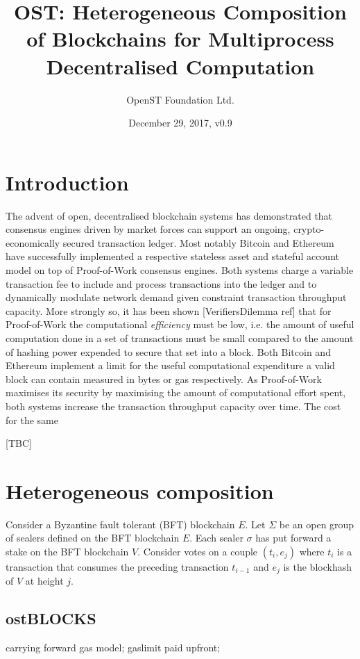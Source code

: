 \documentclass[12pt,a4paper, twocolumn]{article}
\title{{\sc OST: Heterogeneous Composition of Blockchains for Multiprocess Decentralised Computation}}
\author{OpenST Foundation Ltd.}
\date{December 29, 2017, v0.9}
\begin{document}
\maketitle

\section{Introduction}

The advent of open, decentralised blockchain systems has demonstrated that consensus engines driven by market forces can support an ongoing, crypto-economically secured transaction ledger.  Most notably Bitcoin and Ethereum have successfully implemented a respective stateless asset and stateful account model on top of Proof-of-Work consensus engines.  Both systems charge a variable transaction fee to include and process transactions into the ledger and to dynamically modulate network demand given  constraint transaction throughput capacity.  More strongly so, it has been shown [VerifiersDilemma ref] that for Proof-of-Work the computational \emph{efficiency} must be low, i.e. the amount of useful computation done in a set of transactions must be small compared to the amount of hashing power expended to secure that set into a block.
Both Bitcoin and Ethereum implement a limit for the useful computational expenditure a valid block can contain measured in bytes or gas respectively.  As Proof-of-Work maximises its security by maximising the amount of computational effort spent, both systems increase the transaction throughput capacity over time.  The cost for the same 

[TBC]

\section{Heterogeneous composition}

Consider a Byzantine fault tolerant (BFT) blockchain $E$. Let $\Sigma$ be an open group of sealers defined on the BFT blockchain $E$.  Each sealer $\sigma$ has put forward a stake on the BFT blockchain $V$. Consider votes on a couple $(t_i, e_j)$ where $t_i$ is a transaction that consumes the preceding transaction $t_{i-1}$ and $e_j$ is the blockhash of $V$ at height $j$.

\subsection{ostBLOCKS}

carrying forward gas model;
gaslimit paid upfront; 
\end{document}

